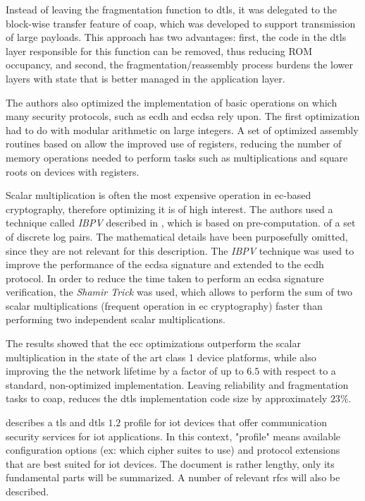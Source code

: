\documentclass{llncs}
\begin{document}
Instead of leaving the fragmentation function to \gls{dtls}, it was
delegated to the block-wise transfer feature of \gls{coap}\cite{RFC7959}, which was developed
to support transmission of large payloads. This approach has two advantages: first, the code in the \gls{dtls}
layer responsible for this function can be removed, thus reducing ROM occupancy,
and second, the fragmentation/reassembly process burdens the lower layers
with state that is better managed in the application layer.

The authors also optimized the implementation of basic operations on which
many security protocols, such as \gls{ecdh} and \gls{ecdsa} rely upon. The first
optimization had to do with modular arithmetic on large integers. A set of optimized
assembly routines based on \cite{Comparin25:Online} allow the improved use of
registers, reducing the number of memory operations needed to perform
tasks such as multiplications and square roots on devices with  registers.

Scalar multiplication is often the most expensive operation in \gls{ec}-based
cryptography, therefore optimizing it is of high interest. The authors used a
technique called \textit{IBPV} described in \cite{LowcostS87:online}, which is based on pre-computation.
of a set of discrete log pairs. The mathematical details have been purposefully omitted,
since they are not relevant for this description. The \textit{IBPV} technique was used
to improve the performance of the \gls{ecdsa} signature and extended to the
\gls{ecdh} protocol. In order to reduce the time taken to perform an \gls{ecdsa}
signature verification, the \textit{Shamir Trick} was used, which allows
to perform the sum of two scalar multiplications (frequent operation in \gls{ec} cryptography)
faster than performing two independent scalar multiplications.

The results showed that the \gls{ecc} optimizations
outperform the scalar multiplication in the state of the art class 1 device platforms,
while also improving the the network lifetime by a factor of up to $6.5$ with
respect to a standard, non-optimized implementation. Leaving reliability and
fragmentation tasks to \gls{coap}, reduces the \gls{dtls} implementation code size
by approximately $23\%$.

\cite{RFC7925} describes a \gls{tls} and \gls{dtls} $1.2$
profile for \gls{iot} devices that offer communication security services
for \gls{iot} applications.
In this context, "profile" means available configuration options (ex: which
cipher suites to use) and protocol extensions that are best suited for \gls{iot} devices.
The document is rather lengthy, only its fundamental parts will be summarized. A number of relevant \gls{rfc}s will also be described.
\end{document}
